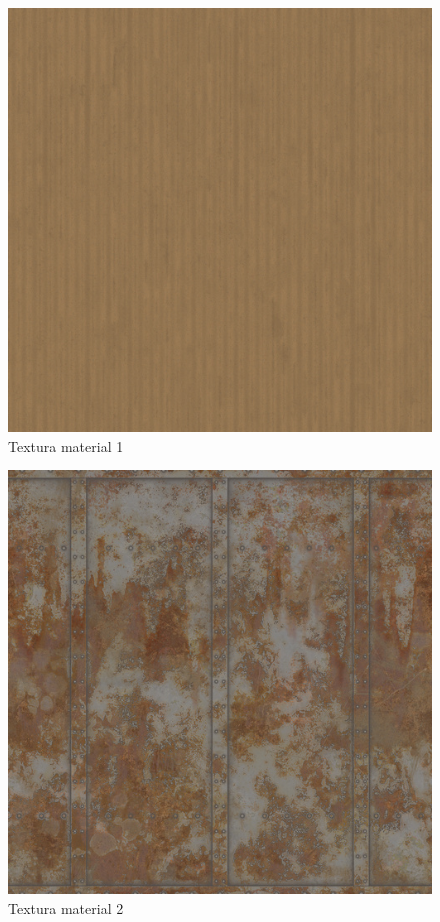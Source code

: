 \documentclass[12pt]{article}
\begin{document}
\begin{figure}[H]
\centering
\includegraphics[scale=1]{images/card.jpg}
\caption{Textura material 1}
\end{figure}

\begin{figure}[H]
\centering
\includegraphics[scale=1]{images/rust.jpg}
\caption{Textura material 2}
\end{figure}
\end{document}
